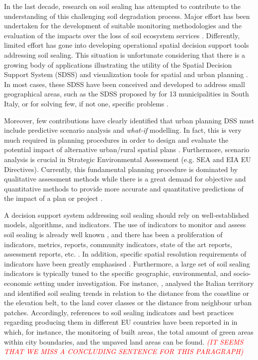 \documentclass[APA,LATO1COL,doublespace]{WileyNJD-v2}
\newcommand{\toberevised}[1]{\emph{\textcolor{red}{#1}}} %
\begin{document}
In the last decade, research on soil sealing has attempted to contribute to the understanding of this challenging soil degradation process. Major effort has been undertaken for the development of suitable monitoring methodologies \citep{ISPRA18,Alvarado18} and the evaluation of the impacts over the loss of soil ecosystem services \citep{Calzolari16}. Differently, limited effort has gone into developing operational spatial decision support tools addressing soil sealing.
This situation is unfortunate considering that there is a growing body of applications illustrating the utility of the Spatial Decision Support System (SDSS) and visualization tools for spatial and urban planning  \citep[e.g.][]{Bishop98,Geertman12,Carsjens07,Malczewski04,Malczewski06,Meyer08}.
In most cases, these SDSS have been conceived and developed to address small geographical areas, such as the SDSS proposed by \cite{Piero17} for 13 municipalities in South Italy, or for solving few, if not one, specific problems \citep[e.g.][]{Fedra98,Meyer08,Torresan16}. %

Moreover, few contributions have clearly identified that urban planning DSS must include predictive scenario analysis \citep{Choi16,Xiang03,Volk10} and \textit{what-if} modelling. In fact, this is very much required in planning procedures in order to design and evaluate the potential impact of alternative urban/rural spatial plans \citep{Hawkins02,Harms95,Choi16,vonHaaren06}. 
Furthermore, scenario analysis is crucial in Strategic Environmental Assessment (e.g. SEA and EIA EU Directives). Currently, this fundamental planning procedure is dominated by qualitative assessment methods while there is a great demand for objective and quantitative methods \citep{Choi16} to provide more accurate and quantitative predictions of the impact of a plan or project \citep{Carver03,Vanderhaegen05}.

A decision support system addressing soil sealing should rely on well-established models, algorithms, and indicators. The use of indicators to monitor and assess soil sealing is already well known \citep{King16}, and there has been a proliferation of indicators, metrics, reports, community indicators, state of the art reports, assessment reports, etc. \citep{Maclaren96,Tanguay10}.
In addition, specific spatial resolution requirements of indicators have been greatly emphasised \citep{Jaeger08}.
Furthermore, a large set of soil sealing indicators is typically tuned to the specific geographic, environmental, and socio-economic setting under investigation.
For instance, \citet{Munafo13}, analysed the Italian territory and identified soil sealing trends in relation to the distance from the coastline or the elevation belt, to the land cover classes or the distance from neighbour urban patches.
Accordingly, references to soil sealing indicators and best practices regarding producing them in different EU countries have been reported in \citep{EC2011b} in which, for instance, the monitoring of built areas, the total amount of green areas within city boundaries, and the unpaved land areas can be found. \toberevised{(IT SEEMS THAT WE MISS A CONCLUDING SENTENCE FOR THIS PARAGRAPH)}
\end{document}
